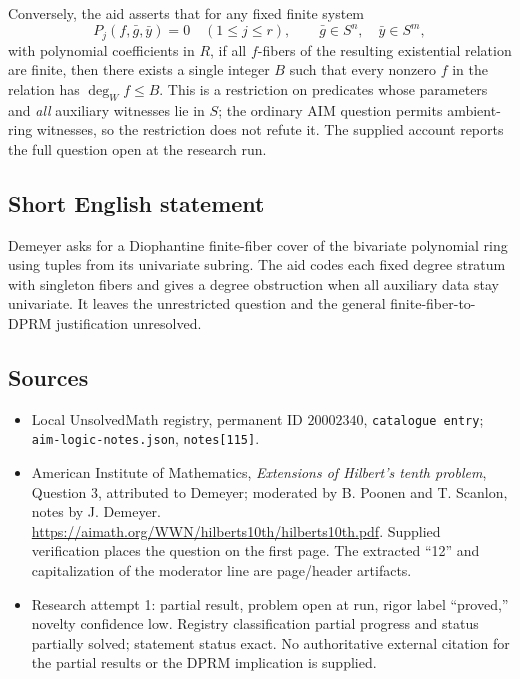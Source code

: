 \documentclass[11pt]{article}
\begin{document}
Conversely, the aid asserts that for any fixed finite system
\[
P_j(f,\bar g,\bar y)=0\quad(1\leq j\leq r),\qquad
\bar g\in S^n,\quad\bar y\in S^m,
\]
with polynomial coefficients in $R$, if all $f$-fibers of the resulting existential relation are finite, then there exists a single integer $B$ such that every nonzero $f$ in the relation has $\deg_W f\leq B$. This is a restriction on predicates whose parameters and \emph{all} auxiliary witnesses lie in $S$; the ordinary AIM question permits ambient-ring witnesses, so the restriction does not refute it. The supplied account reports the full question open at the research run.
\subsection{Short English statement}
Demeyer asks for a Diophantine finite-fiber cover of the bivariate polynomial ring using tuples from its univariate subring. The aid codes each fixed degree stratum with singleton fibers and gives a degree obstruction when all auxiliary data stay univariate. It leaves the unrestricted question and the general finite-fiber-to-DPRM justification unresolved.
\subsection{Sources}
\begin{itemize}
\item Local UnsolvedMath registry, permanent ID $20002340$, \texttt{catalogue entry}; \texttt{aim-logic-notes.json}, \texttt{notes[115]}.
\item American Institute of Mathematics, \emph{Extensions of Hilbert's tenth problem}, Question 3, attributed to Demeyer; moderated by B. Poonen and T. Scanlon, notes by J. Demeyer. \url{https://aimath.org/WWN/hilberts10th/hilberts10th.pdf}. Supplied verification places the question on the first page. The extracted ``12'' and capitalization of the moderator line are page/header artifacts.
\item Research attempt 1: partial result, problem open at run, rigor label ``proved,'' novelty confidence low. Registry classification partial progress and status partially solved; statement status exact. No authoritative external citation for the partial results or the DPRM implication is supplied.
\end{itemize}
\end{document}

